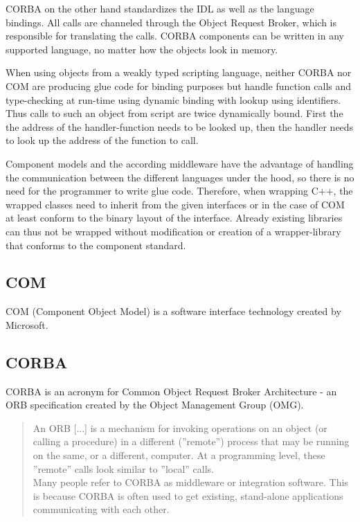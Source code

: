 CORBA on the other hand standardizes the IDL as well as the language bindings. All calls are channeled through the Object Request Broker, which is responsible for translating the calls. CORBA components can be written in any supported language, no matter how the objects look in memory.

When using objects from a weakly typed scripting language, neither CORBA nor COM are producing glue code for binding purposes but handle function calls and type-checking at run-time using dynamic binding with lookup using identifiers. Thus calls to such an object from script are twice dynamically bound. First the the address of the handler-function needs to be looked up, then the handler needs to look up the address of the function to call.

Component models and the according middleware have the advantage of handling the communication between the different languages under the hood, so there is no need for the programmer to write glue code. Therefore, when wrapping C++, the wrapped classes need to inherit from the given interfaces or in the case of COM at least conform to the binary layout of the interface. Already existing libraries can thus not be wrapped without modification or creation of a wrapper-library that conforms to the component standard.

\subsection{COM}

COM (Component Object Model) is a software interface technology created by Microsoft.

\subsection{CORBA}

CORBA is an acronym for Common Object Request Broker Architecture - an ORB specification created by the Object Management Group (OMG).

\begin{quotation}
An ORB [...] is a mechanism for invoking operations on an object (or calling a procedure) in a different (''remote'') process that may be running on the same, or a different, computer. At a programming level, these ''remote'' calls look similar to ''local'' calls.\\
Many people refer to CORBA as middleware or integration software. This is because CORBA is often used to get existing, stand-alone applications communicating with each other.
\end{quotation}

